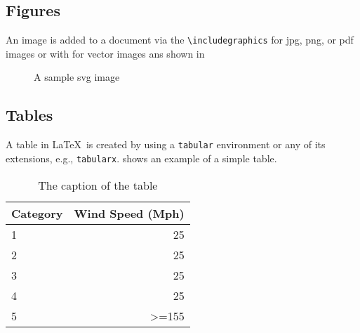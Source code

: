 \subsection{Figures}

An image is added to a document via the \verb|\includegraphics| for jpg, png, or pdf images  or with \verb|| for vector images ans shown in 

\begin{figure}[h!]
\centering
   
  \caption{A sample svg image}
  \label{fig:sample-fig}
\end{figure}


\subsection{Tables}



A table in \LaTeX\ is created by using a \verb|tabular| environment or any of its extensions, e.g., \verb|tabularx|.
 shows an example of a simple table.

\begin{table}[th!]
\centering
\begin{tabular}{p{4cm}r}
\toprule
Category                & Wind	Speed (Mph)             \\ \midrule
1                       & 25                            \\
2                       & 25                            \\
3                       & 25                            \\ \midrule
4                       & 25                            \\
5                       & \textgreater{}=155           \\ \bottomrule
\end{tabular}
 \caption{The caption of the table}\label{tab:example}
\end{table}

